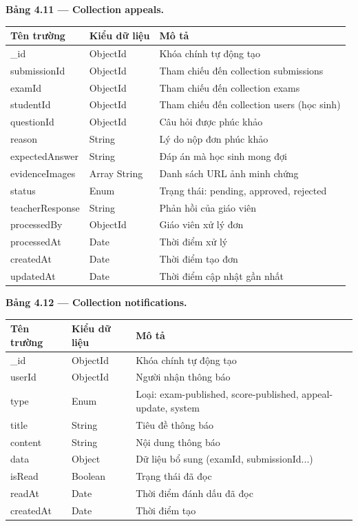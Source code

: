 ﻿\documentclass[../DoAn.tex]{subfiles}
\begin{document}
\noindent\textbf{Bảng 4.11 — Collection appeals.}
\begin{center}
\begin{tabular}{|p{3.5cm}|p{2.5cm}|p{7cm}|}
\hline
\textbf{Tên trường} & \textbf{Kiểu dữ liệu} & \textbf{Mô tả} \\ \hline
\_id & ObjectId & Khóa chính tự động tạo \\ \hline
submissionId & ObjectId & Tham chiếu đến collection submissions \\ \hline
examId & ObjectId & Tham chiếu đến collection exams \\ \hline
studentId & ObjectId & Tham chiếu đến collection users (học sinh) \\ \hline
questionId & ObjectId & Câu hỏi được phúc khảo \\ \hline
reason & String & Lý do nộp đơn phúc khảo \\ \hline
expectedAnswer & String & Đáp án mà học sinh mong đợi \\ \hline
evidenceImages & Array String & Danh sách URL ảnh minh chứng \\ \hline
status & Enum & Trạng thái: pending, approved, rejected \\ \hline
teacherResponse & String & Phản hồi của giáo viên \\ \hline
processedBy & ObjectId & Giáo viên xử lý đơn \\ \hline
processedAt & Date & Thời điểm xử lý \\ \hline
createdAt & Date & Thời điểm tạo đơn \\ \hline
updatedAt & Date & Thời điểm cập nhật gần nhất \\ \hline
\end{tabular}
\end{center}

\vspace{0.3cm}

\noindent\textbf{Bảng 4.12 — Collection notifications.}
\begin{center}
\begin{tabular}{|p{3.5cm}|p{2.5cm}|p{7cm}|}
\hline
\textbf{Tên trường} & \textbf{Kiểu dữ liệu} & \textbf{Mô tả} \\ \hline
\_id & ObjectId & Khóa chính tự động tạo \\ \hline
userId & ObjectId & Người nhận thông báo \\ \hline
type & Enum & Loại: exam-published, score-published, appeal-update, system \\ \hline
title & String & Tiêu đề thông báo \\ \hline
content & String & Nội dung thông báo \\ \hline
data & Object & Dữ liệu bổ sung (examId, submissionId...) \\ \hline
isRead & Boolean & Trạng thái đã đọc \\ \hline
readAt & Date & Thời điểm đánh dấu đã đọc \\ \hline
createdAt & Date & Thời điểm tạo \\ \hline
\end{tabular}
\end{center}
\end{document}
